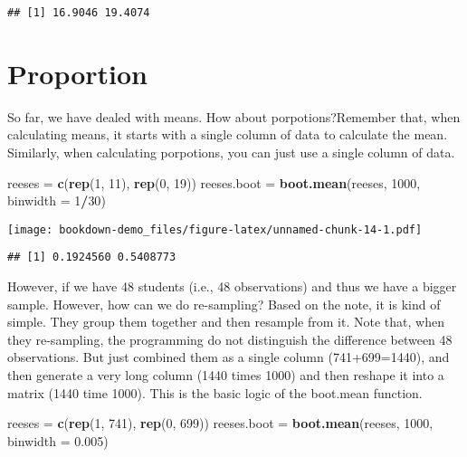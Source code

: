 \documentclass[]{book}
\newenvironment{Shaded}{\begin{snugshade}}{\end{snugshade}}
\newcommand{\DataTypeTok}[1]{\textcolor[rgb]{0.13,0.29,0.53}{#1}}
\newcommand{\DecValTok}[1]{\textcolor[rgb]{0.00,0.00,0.81}{#1}}
\newcommand{\FloatTok}[1]{\textcolor[rgb]{0.00,0.00,0.81}{#1}}
\newcommand{\KeywordTok}[1]{\textcolor[rgb]{0.13,0.29,0.53}{\textbf{#1}}}
\newcommand{\NormalTok}[1]{#1}
\newcommand{\OperatorTok}[1]{\textcolor[rgb]{0.81,0.36,0.00}{\textbf{#1}}}
\newcommand{\StringTok}[1]{\textcolor[rgb]{0.31,0.60,0.02}{#1}}
\begin{document}
\begin{verbatim}
## [1] 16.9046 19.4074
\end{verbatim}

\hypertarget{proportion}{%
\section{Proportion}\label{proportion}}

So far, we have dealed with means. How about porpotions?Remember that, when calculating means, it starts with a single column of data to calculate the mean. Similarly, when calculating porpotions, you can just use a single column of data.

\begin{Shaded}
\begin{Highlighting}[]
\NormalTok{reeses =}\StringTok{ }\KeywordTok{c}\NormalTok{(}\KeywordTok{rep}\NormalTok{(}\DecValTok{1}\NormalTok{, }\DecValTok{11}\NormalTok{), }\KeywordTok{rep}\NormalTok{(}\DecValTok{0}\NormalTok{, }\DecValTok{19}\NormalTok{))}
\NormalTok{reeses.boot =}\StringTok{ }\KeywordTok{boot.mean}\NormalTok{(reeses, }\DecValTok{1000}\NormalTok{, }\DataTypeTok{binwidth =} \DecValTok{1}\OperatorTok{/}\DecValTok{30}\NormalTok{)}
\end{Highlighting}
\end{Shaded}

\texttt{[image: bookdown-demo\_files/figure-latex/unnamed-chunk-14-1.pdf]}

\begin{verbatim}
## [1] 0.1924560 0.5408773
\end{verbatim}

However, if we have 48 students (i.e., 48 observations) and thus we have a bigger sample. However, how can we do re-sampling? Based on the note, it is kind of simple. They group them together and then resample from it. Note that, when they re-sampling, the programming do not distinguish the difference between 48 observations. But just combined them as a single column (741+699=1440), and then generate a very long column (1440 times 1000) and then reshape it into a matrix (1440 time 1000). This is the basic logic of the boot.mean function.

\begin{Shaded}
\begin{Highlighting}[]
\NormalTok{reeses =}\StringTok{ }\KeywordTok{c}\NormalTok{(}\KeywordTok{rep}\NormalTok{(}\DecValTok{1}\NormalTok{, }\DecValTok{741}\NormalTok{), }\KeywordTok{rep}\NormalTok{(}\DecValTok{0}\NormalTok{, }\DecValTok{699}\NormalTok{))}
\NormalTok{reeses.boot =}\StringTok{ }\KeywordTok{boot.mean}\NormalTok{(reeses, }\DecValTok{1000}\NormalTok{, }\DataTypeTok{binwidth =} \FloatTok{0.005}\NormalTok{)}
\end{Highlighting}
\end{Shaded}
\end{document}

